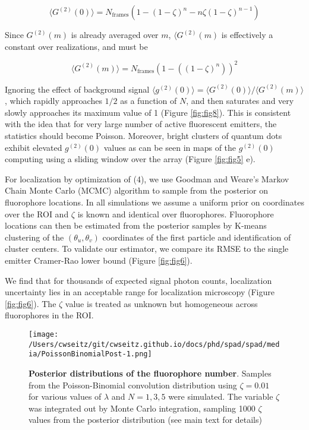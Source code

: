 \begin{equation}
\langle G^{(2)}(0)\rangle = N_{\mathrm{frames}}(1 - (1-\zeta)^n - n\zeta (1-\zeta)^{n-1})
\end{equation}

Since $G^{(2)}(m)$ is already averaged over $m$, $\langle G^{(2)}(m) $ is effectively a constant over realizations, and must be

\begin{equation}
\langle G^{(2)}(m)\rangle =  N_{\mathrm{frames}} \left(1 - \left((1-\zeta)^n\right)\right)^2
\end{equation}

Ignoring the effect of background signal $\langle g^{(2)}(0)\rangle =\langle G^{(2)}(0)\rangle/\langle G^{(2)}(m)\rangle$, which rapidly approaches $1/2$ as a function of $N$, and then saturates and very slowly approaches its maximum value of 1 (Figure \ref{fig:fig8}). This is consistent with the idea that for very large number of active fluorescent emitters, the statistics should become Poisson. Moreover, bright clusters of quantum dots exhibit elevated $g^{(2)}(0)$ values as can be seen in maps of the $g^{(2)}(0)$ computing using a sliding window over the array (Figure \ref{fig:fig5} e).

For localization by optimization of (4), we use Goodman and Weare's Markov Chain Monte Carlo (MCMC) algorithm \parencite{Goodman2010} to sample from the posterior on fluorophore locations. In all simulations we assume a uniform prior on coordinates over the ROI and $\zeta$ is known and identical over fluorophores. Fluorophore locations can then be estimated from the posterior samples by K-means clustering of the $(\theta_u,\theta_v)$ coordinates of the first particle and identification of cluster centers. To validate our estimator, we compare its RMSE to the single emitter Cramer-Rao lower bound  (Figure \ref{fig:fig6}).

We find that for thousands of expected signal photon counts, localization uncertainty lies in an acceptable range for localization microscopy (Figure \ref{fig:fig6}). The $\zeta$ value is treated as unknown but homogeneous across fluorophores in the ROI.

\begin{figure*}[t]
\centering
\texttt{[image: /Users/cwseitz/git/cwseitz.github.io/docs/phd/spad/spad/media/PoissonBinomialPost-1.png]}
\caption{\textbf{Posterior distributions of the fluorophore number}. Samples from the Poisson-Binomial convolution distribution using $\zeta=0.01$ for various values of $\lambda$ and $N=1,3,5$ were simulated. The variable $\zeta$ was integrated out by Monte Carlo integration, sampling 1000 $\zeta$ values from the posterior distribution (see main text for details)}
\label{fig:fig9}
\end{figure*}    

